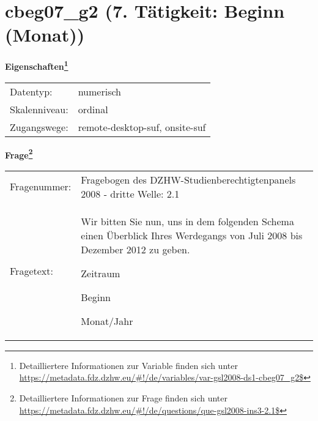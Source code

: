 
    \setcounter{footnote}{0}

    \vspace*{-1.8cm}
	\section{cbeg07\_g2 (7. Tätigkeit: Beginn (Monat))}
	\label{section:cbeg07_g2}



    \vspace*{0.5cm}
    \noindent\textbf{Eigenschaften\footnote{Detailliertere Informationen zur Variable finden sich unter
		\url{https://metadata.fdz.dzhw.eu/\#!/de/variables/var-gsl2008-ds1-cbeg07_g2$}}}\\
	\begin{tabularx}{\hsize}{@{}lX}
	Datentyp: & numerisch \\
	Skalenniveau: & ordinal \\
	Zugangswege: &
	  remote-desktop-suf, 
	  onsite-suf
 \\
    \end{tabularx}



				\vspace*{0.5cm}
                \noindent\textbf{Frage\footnote{Detailliertere Informationen zur Frage finden sich unter
		              \url{https://metadata.fdz.dzhw.eu/\#!/de/questions/que-gsl2008-ins3-2.1$}}}\\
				\begin{tabularx}{\hsize}{@{}lX}
					Fragenummer: &
					  Fragebogen des DZHW-Studienberechtigtenpanels 2008 - dritte Welle:
					  2.1
 \\
					Fragetext: & Wir bitten Sie nun, uns in dem folgenden Schema einen Überblick Ihres Werdegangs von Juli 2008 bis Dezember 2012 zu geben.\par  Zeitraum\par  Beginn\par  Monat/Jahr \\
				\end{tabularx}






